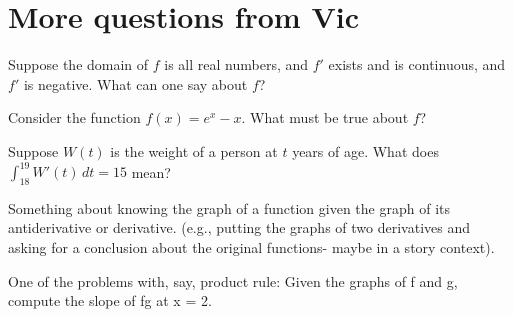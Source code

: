 \documentclass{ximera}
\newcommand{\BADBAD}{\marginpar{\textbf{BADBAD}}}
\begin{document}
\section{More questions from Vic}

\begin{problem}
  Suppose the domain of $f$ is all real numbers, and $f'$ exists and is continuous, and $f'$ is negative.  What can one say about $f$?
  \begin{multipleChoice}
  \end{multipleChoice}
\end{problem}

\begin{problem}
  Consider the function $f(x) = e^x - x$.  What must be true about $f$?
  \begin{multipleChoice}
  \end{multipleChoice}
\end{problem}

\begin{problem}
  Suppose $W(t)$ is the weight of a person at $t$ years of age.  What does $\int_{18}^19 W'(t) \, dt = 15$ mean?
  \begin{multipleChoice}
  \end{multipleChoice}
\end{problem}

\begin{problem}
  \BADBAD Something about knowing the graph of a function given the graph of
  its antiderivative or derivative. (e.g., putting the graphs of two
  derivatives and asking for a conclusion about the original
  functions- maybe in a story context).
  \begin{multipleChoice}
  \end{multipleChoice}
\end{problem}


\begin{problem}
  \BADBAD One of the problems with, say, product rule: Given the
  graphs of f and g, compute the slope of fg at x = 2.
  \begin{multipleChoice}
  \end{multipleChoice}
\end{problem}
 
\end{document}
